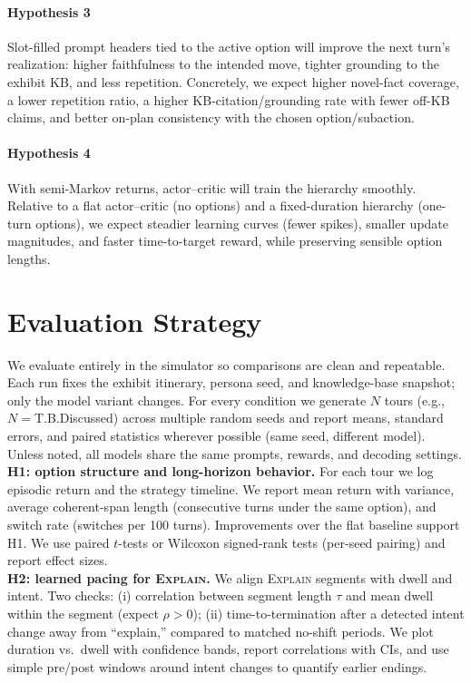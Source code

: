 \documentclass[12pt]{article}
\begin{document}
\paragraph{Hypothesis 3}

Slot-filled prompt headers tied to the active option will improve the next turn’s realization: higher faithfulness to the intended move, tighter grounding to the exhibit KB, and less repetition. Concretely, we expect higher novel-fact coverage, a lower repetition ratio, a higher KB-citation/grounding rate with fewer off-KB claims, and better on-plan consistency with the chosen option/subaction.

\paragraph{Hypothesis 4}

With semi-Markov returns, actor–critic will train the hierarchy smoothly. Relative to a flat actor–critic (no options) and a fixed-duration hierarchy (one-turn options), we expect steadier learning curves (fewer spikes), smaller update magnitudes, and faster time-to-target reward, while preserving sensible option lengths.


\section{Evaluation Strategy}

We evaluate entirely in the simulator so comparisons are clean and repeatable. Each run fixes the exhibit itinerary, persona seed, and knowledge-base snapshot; only the model variant changes. For every condition we generate \(N\) tours (e.g., \(N{=}\)T.B.Discussed) across multiple random seeds and report means, standard errors, and paired statistics wherever possible (same seed, different model). Unless noted, all models share the same prompts, rewards, and decoding settings.\\


\textbf{H1: option structure and long-horizon behavior.}
For each tour we log episodic return and the strategy timeline. We report mean return with variance, average coherent-span length (consecutive turns under the same option), and switch rate (switches per 100 turns). Improvements over the flat baseline support H1. We use paired \(t\)-tests or Wilcoxon signed-rank tests (per-seed pairing) and report effect sizes.\\

\textbf{H2: learned pacing for \textsc{Explain}.}
We align \textsc{Explain} segments with dwell and intent. Two checks: (i) correlation between segment length \(\tau\) and mean dwell within the segment (expect \(\rho{>}0\)); (ii) time-to-termination after a detected intent change away from “explain,” compared to matched no-shift periods. We plot duration vs.\ dwell with confidence bands, report correlations with CIs, and use simple pre/post windows around intent changes to quantify earlier endings.\\
\end{document}
